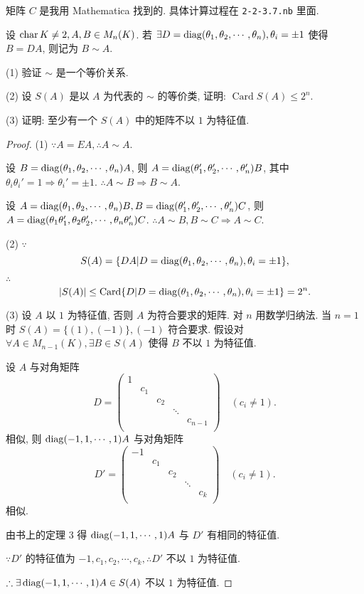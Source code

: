 \documentclass{ctexart}
\begin{document}
\begin{note}
    矩阵 $C$ 是我用 Mathematica 找到的. 具体计算过程在 \verb|2-2-3.7.nb| 里面.
\end{note}
\begin{exercise}%
    设 $\operatorname{char} K\neq2,A,B\in M_n(K)$. 若 $\exists D=\operatorname{diag} (\theta_1,\theta_2,\cdots,\theta_n),\theta_i=\pm1$ 使得 $B=DA$, 则记为 $B\sim A$.

    (1) 验证 $\sim$ 是一个等价关系.

    (2) 设 $S(A)$ 是以 $A$ 为代表的 $\sim$ 的等价类, 证明: $\operatorname{Card}S(A)\leq2^n$.

    (3) 证明: 至少有一个 $S(A)$ 中的矩阵不以 $1$ 为特征值.
\end{exercise}
\begin{proof}
    (1) $\because A=EA,\therefore A\sim A$.

    设 $B=\operatorname{diag} (\theta_1,\theta_2,\cdots,\theta_n)A$, 则 $A=\operatorname{diag} (\theta_1',\theta_2',\cdots,\theta_n')B$, 其中 $\theta_i\theta_i'=1\Rightarrow\theta_i'=\pm1$. $\therefore A\sim B\Rightarrow B\sim A$.

    设 $A=\operatorname{diag} (\theta_1,\theta_2,\cdots,\theta_n)B,B=\operatorname{diag} (\theta_1',\theta_2',\cdots,\theta_n')C$, 则 $A=\operatorname{diag} (\theta_1\theta_1',\theta_2\theta_2',\cdots,\theta_n\theta_n')C$. $\therefore A\sim B,B\sim C\Rightarrow A\sim C$.

    (2) $\because$
    \[S(A)=\{DA|D=\operatorname{diag} (\theta_1,\theta_2,\cdots,\theta_n),\theta_i=\pm1\},\]

    $\therefore$
    \[|S(A)|\leq\operatorname{Card}\{D|D=\operatorname{diag} (\theta_1,\theta_2,\cdots,\theta_n),\theta_i=\pm1\}=2^n.\]

    (3) 设 $A$ 以 $1$ 为特征值, 否则 $A$ 为符合要求的矩阵. 对 $n$ 用数学归纳法. 当 $n=1$ 时 $S(A)=\{(1),(-1)\},(-1)$ 符合要求. 假设对 $\forall A\in M_{n-1}(K),\exists B\in S(A)$ 使得 $B$ 不以 $1$ 为特征值.
    
    设 $A$ 与对角矩阵
    \[D=\begin{pmatrix}
        1 \\
        & c_1 \\
        && c_2 \\
        &&& \ddots \\
        &&&& c_{n-1} \\
    \end{pmatrix}\quad(c_i\neq 1).\]
    相似, 则 $\operatorname{diag} (-1,1,\cdots,1)A$ 与对角矩阵
    \[D'=\begin{pmatrix}
        -1 \\
        & c_1 \\
        && c_2 \\
        &&& \ddots \\
        &&&& c_k \\
    \end{pmatrix}\quad(c_i\neq 1).\]
    相似.
    
    由书上的定理 3 得 $\operatorname{diag} (-1,1,\cdots,1)A$ 与 $D'$ 有相同的特征值.

    $\because D'$ 的特征值为 $-1,c_1,c_2,\cdots,c_k,\therefore D'$ 不以 $1$ 为特征值.

    $\therefore\exists\operatorname{diag} (-1,1,\cdots,1)A\in S(A)$ 不以 $1$ 为特征值.
\end{proof}
\end{document}
